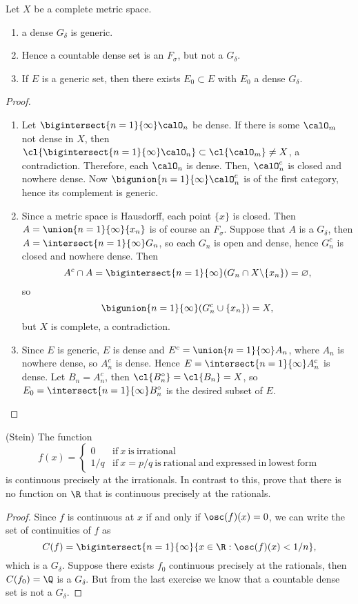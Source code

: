 \begin{problemset}
\item Let $X$ be a complete metric space.
\begin{enumerate}
    \item a dense $G_\delta$ is generic.
    \item Hence a countable dense set is an $F_\sigma$, but not a $G_\delta$.
    \item If $E$ is a generic set, then there exists $E_0 \subset E$ with $E_0$ a dense $G_\delta$.
\end{enumerate}
\begin{proof}
    \begin{enumerate}
    \item Let $\bigintersect{n=1}{\infty}\calO_n$ be dense. If there is some $\calO_m$ not dense in $X$, then $\cl{\bigintersect{n=1}{\infty}\calO_n} \subset \cl{\calO_m} \neq X$, a contradiction. Therefore, each $\calO_n$ is dense. Then, $\calO_n^c$ is closed and nowhere dense. Now $\bigunion{n=1}{\infty}\calO_n^c$ is of the first category, hence its complement is generic.  
    \item Since a metric space is Hausdorff, each point $\{x\}$ is closed. Then $A=\union{n=1}{\infty}\{x_n\}$ is of course an $F_\sigma$. Suppose that $A$ is a $G_\delta$, then $A=\intersect{n=1}{\infty}G_n$, so each $G_n$ is open and dense, hence $G_n^c$ is closed and nowhere dense. Then 
    $$A^c \cap A = \bigintersect{n=1}{\infty}(G_n \cap X\backslash \{x_n\}) = \varnothing,$$
    so $$\bigunion{n=1}{\infty}(G_n^c \cup \{x_n\}) = X,$$
    but $X$ is complete, a contradiction.
    \item Since $E$ is generic, $E$ is dense and $E^c=\union{n=1}{\infty}A_n$, where $A_n$ is nowhere dense, so $A_n^c$ is dense. Hence $E=\intersect{n=1}{\infty}A_n^c$ is dense. Let $B_n=A_n^c$, then $\cl{B_n^\circ} = \cl{B_n} = X$, so $E_0=\intersect{n=1}{\infty}B_n^\circ$ is the desired subset of $E$.     
    \end{enumerate}
\end{proof}

\item (Stein) The function
$$f(x)=\begin{cases}
    0 & \mathrm{if~}x\mathrm{~is~irrational} \\
    1/q & \mathrm{if~}x=p/q\mathrm{~is~rational~and~expressed~in~lowest~form}
\end{cases}$$
is continuous precisely at the irrationals. In contrast to this, prove that there is no function on $\R$ that is continuous precisely at the rationals.
\begin{proof}
    Since $f$ is continuous at $x$ if and only if $\osc(f)(x)=0$, we can write the set of continuities of $f$ as 
    $$C(f) = \bigintersect{n=1}{\infty}\{x \in \R: \osc(f)(x) < 1/n\},$$
    which is a $G_\delta$. Suppose there exists $f_0$ continuous precisely at the rationals, then 
    $C(f_0)=\Q$ is a $G_\delta$. But from the last exercise we know that a countable dense set is not a $G_\delta$. 
\end{proof}


\end{problemset}
